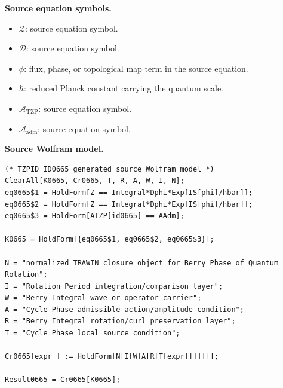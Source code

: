 \begin{minipage}[t]{0.49\linewidth}
\begingroup
\small
\raggedright
\textbf{Source equation symbols.}\par
\begin{itemize}[leftmargin=1.35em,itemsep=1pt,topsep=1pt,parsep=0pt]
    \item $\mathcal{Z}$: source equation symbol.
    \item $\mathcal{D}$: source equation symbol.
    \item $\phi$: flux, phase, or topological map term in the source equation.
    \item $\hbar$: reduced Planck constant carrying the quantum scale.
    \item $\mathcal{A}_{\mathrm{TZP}}$: source equation symbol.
    \item $\mathcal{A}_{\mathrm{adm}}$: source equation symbol.
\end{itemize}
\endgroup
\end{minipage}\hfill
\begin{minipage}[t]{0.47\linewidth}
\begingroup
\scriptsize
\raggedright
\textbf{Source Wolfram model.}\par
\begin{Verbatim}[fontsize=\tiny,breaklines=true,breakanywhere=true]
(* TZPID ID0665 generated source Wolfram model *)
ClearAll[K0665, Cr0665, T, R, A, W, I, N];
eq0665$1 = HoldForm[Z == Integral*Dphi*Exp[IS[phi]/hbar]];
eq0665$2 = HoldForm[Z == Integral*Dphi*Exp[IS[phi]/hbar]];
eq0665$3 = HoldForm[ATZP[id0665] == AAdm];

K0665 = HoldForm[{eq0665$1, eq0665$2, eq0665$3}];

N = "normalized TRAWIN closure object for Berry Phase of Quantum Rotation";
I = "Rotation Period integration/comparison layer";
W = "Berry Integral wave or operator carrier";
A = "Cycle Phase admissible action/amplitude condition";
R = "Berry Integral rotation/curl preservation layer";
T = "Cycle Phase local source condition";

Cr0665[expr_] := HoldForm[N[I[W[A[R[T[expr]]]]]]];

Result0665 = Cr0665[K0665];
\end{Verbatim}
\endgroup
\end{minipage}

